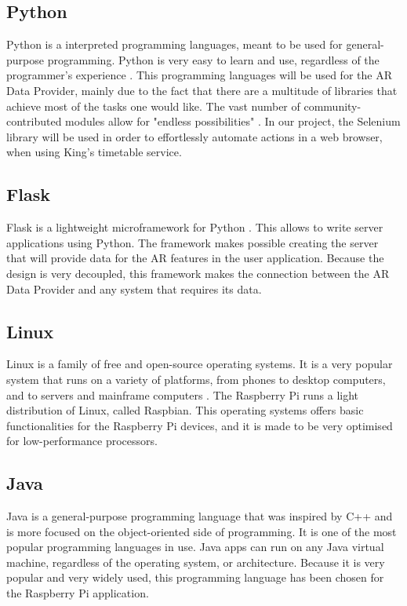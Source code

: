 \subsection{Python}
Python is a interpreted programming languages, meant to be used for general-purpose programming. Python is very easy to learn and use, regardless of the programmer's experience \cite{python}. This programming languages will be used for the AR Data Provider, mainly due to the fact that there are a multitude of libraries that achieve most of the tasks one would like. The vast number of community-contributed modules allow for "endless possibilities" \cite{python}. In our project, the Selenium library will be used in order to effortlessly automate actions in a web browser, when using King's timetable service.

\subsection{Flask}
Flask is a lightweight microframework for Python \cite{flask}. This allows to write server applications using Python. The framework makes possible creating the server that will provide data for the AR features in the user application. Because the design is very decoupled, this framework makes the connection between the AR Data Provider and any system that requires its data.

\subsection{Linux}
Linux is a family of free and open-source operating systems. It is a very popular system that runs on a variety of platforms, from phones to desktop computers, and to servers and mainframe computers \cite{linux}. The Raspberry Pi runs a light distribution of Linux, called Raspbian. This operating systems offers basic functionalities for the Raspberry Pi devices, and it is made to be very optimised for low-performance processors.

\subsection{Java}
Java is a general-purpose programming language that was inspired by C++ and is more focused on the object-oriented side of programming. It is one of the most popular programming languages in use. Java apps can run on any Java virtual machine, regardless of the operating system, or architecture. Because it is very popular and very widely used, this programming language has been chosen for the Raspberry Pi application.

